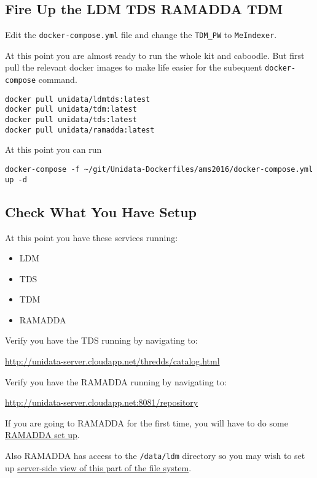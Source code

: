 \documentclass[11pt]{article}
\begin{document}
\subsection*{Fire Up the LDM TDS RAMADDA TDM}
\label{sec:orgheadline15}

Edit the \texttt{docker-compose.yml} file and change the \texttt{TDM\_PW} to \texttt{MeIndexer}.

At this point you are almost ready to run the whole kit and caboodle. But first  pull the relevant docker images to make life easier for the subequent \texttt{docker-compose} command.


\begin{verbatim}
docker pull unidata/ldmtds:latest
docker pull unidata/tdm:latest
docker pull unidata/tds:latest
docker pull unidata/ramadda:latest
\end{verbatim}

At this point you can run 

\begin{verbatim}
docker-compose -f ~/git/Unidata-Dockerfiles/ams2016/docker-compose.yml up -d
\end{verbatim}

\subsection*{Check What You Have Setup}
\label{sec:orgheadline16}

At this point you have these services running:

\begin{itemize}
\item LDM
\item TDS
\item TDM
\item RAMADDA
\end{itemize}

Verify you have the TDS running by navigating to:

\url{http://unidata-server.cloudapp.net/thredds/catalog.html}

Verify you have the RAMADDA running by navigating to:

\url{http://unidata-server.cloudapp.net:8081/repository}

If you are going to RAMADDA for the first time, you will have to do some \href{http://ramadda.org//repository/userguide/toc.html}{RAMADDA set up}.

Also RAMADDA has access to the \texttt{/data/ldm} directory so you may wish to set up \href{http://ramadda.org//repository/userguide/developer/filesystem.html}{server-side view of this part of the file system}.
\end{document}
